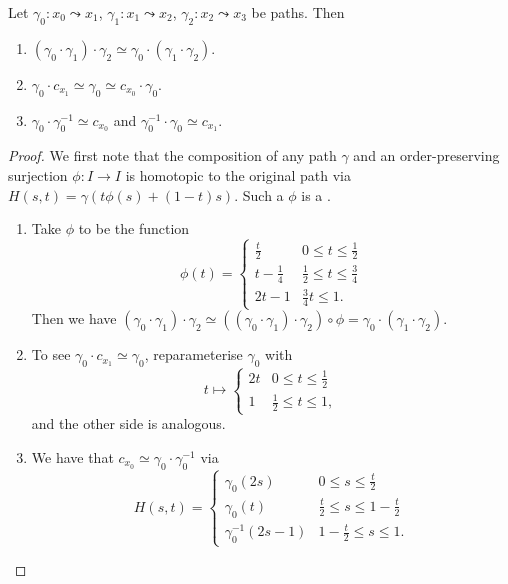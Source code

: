 \documentclass[a4paper, 10pt, twocolumn]{amsart}
\begin{document}
\begin{lemma}
Let $\gamma_0: x_0 \leadsto x_1$, $\gamma_1: x_1 \leadsto x_2$, $\gamma_2: x_2 \leadsto x_3$ be paths.
Then 
\begin{enumerate}
  \item $(\gamma_0 \cdot \gamma_1) \cdot \gamma_2 \simeq \gamma_0 \cdot (\gamma_1 \cdot \gamma_2)$.
  \item $\gamma_0 \cdot c_{x_1} \simeq \gamma_0 \simeq c_{x_0} \cdot \gamma_0$.
  \item $\gamma_0 \cdot \gamma_0^{-1} \simeq c_{x_0}$ and $\gamma_0^{-1} \cdot \gamma_0 \simeq c_{x_1}$.
\end{enumerate}
\end{lemma}
\begin{proof}
  We first note that the composition of any path $\gamma$ and an order-preserving surjection $\phi: I \rightarrow I$ is homotopic to the original path via $H(s, t) = \gamma(t\phi(s) + (1 - t)s)$. Such a $\phi$ is a . 
  \begin{enumerate}
    \item Take $\phi$ to be the function
    $$
    \phi(t)=\begin{cases}
      \frac{t}{2} & 0 \leq t \leq \frac{1}{2} \\
      t - \frac{1}{4} & \frac{1}{2} \leq t \leq \frac{3}{4} \\
      2t - 1 & \frac{3}{4} t \leq 1.
    \end{cases}
    $$
    Then we have $(\gamma_0 \cdot \gamma_1) \cdot \gamma_2 \simeq ((\gamma_0 \cdot \gamma_1) \cdot \gamma_2) \circ \phi = \gamma_0 \cdot (\gamma_1 \cdot \gamma_2)$.
    \item To see $\gamma_0 \cdot c_{x_1} \simeq \gamma_0$, reparameterise $\gamma_0$ with
    $$
t \mapsto \begin{cases}
  2t & 0 \leq t \leq \frac{1}{2} \\
  1 & \frac{1}{2} \leq t \leq 1,
\end{cases}
    $$
    and the other side is analogous.
    \item We have that $c_{x_0} \simeq \gamma_0 \cdot \gamma_0^{-1}$ via
    $$
H(s, t) = \begin{cases}
  \gamma_0(2s) & 0 \leq s \leq \frac{t}{2} \\
  \gamma_0(t) & \frac{t}{2} \leq s \leq 1  - \frac{t}{2} \\
  \gamma_0^{-1}(2s - 1) & 1 - \frac{t}{2} \leq s \leq 1.
\end{cases}
    $$
  \end{enumerate}
  \vspace{-1pc} 
\end{proof}
\end{document}
